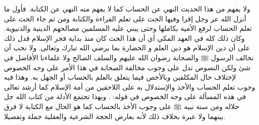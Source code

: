 ولا يفهم من هذا الحديث النهي عن الحساب كما لا يفهم منه النهي عن الكتابة. فأول ما أنزل الله عز وجل إقرا وفيها الحث على تعلم القراءة والكتابة ومن ثم جاء الحث على تعلم الحساب لرفع الأمية بكاملها وحتى يبني عليه المسلمين مصالحهم الدينية والدنيوية. وكان ذلك كله في العهد المكي أي أن هذا الحث كان منذ بداية فجر الإسلام فدل ذلك على أن دين الإسلام هو دين العلم و الحضارة بما يرضي الله تبارك وتعالى. ولا نحب أن نخالف الرسول ﷺ والصحابة رضوان الله عليهم والسلف الصالح ولا علماءنا الأفاضل في شئ ولكن النصوص تدل على وجوب مخالفة الصحابة في هذا الأمر على وجه الخصوص لإختلاف حال المكلفين وبالأخص فيما يتعلق بالعلم بالحساب أو الجهل به. وهذا فيه وجوب تعلم الحساب والأخذ والإستدلال به على اللاحقين من أمة الإسلام كما أرشد تعالى في هذه المسألة على وجه الخصوص في قوله: \quranayah*[10][5] {\footnotesize (\surahname*[10])}. وبهذا تجتمع الأدلة من كتاب الله جل جلاله ومن سنة نبيه ﷺ على وجوب الأخذ بالحساب كما هو الحال مع الكتابة لا فرق بينهما ولا عبرة بخلاف ذلك لأنه يعارض الحجة الشرعية والعقلية جملة وتفصيلا.

\vspace{1em}
\vspace{1em}

